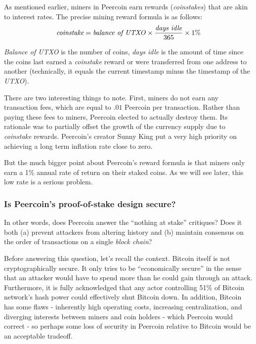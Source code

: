 \documentclass[a4paper,11pt]{article}
\begin{document}
As mentioned earlier, miners in Peercoin earn rewards (\textit{coinstakes}) that are akin to interest rates. The precise mining reward formula is as follows:
$$ \textit{coinstake} = \text{\textit{balance of \textit{UTXO}}}\times \frac{ \text{\textit{days idle}} }{365}\times 1\% $$

\textit{Balance of \textit{UTXO}} is the number of coins, \textit{days idle} is the amount of time since the coins last earned a \textit{coinstake} reward or were transferred from one address to another (technically, it equals the current timestamp minus the timestamp of the \textit{UTXO}). 

There are two interesting things to note. First, miners do not earn any transaction fees, which are equal to $.01$ Peercoin per transaction. Rather than paying these fees to miners, Peercoin elected to actually destroy them. Its rationale was to partially offset the growth of the currency supply due to \textit{coinstake} rewards. Peercoin's creator Sunny King put a very high priority on achieving a long term inflation rate close to zero.

But the much bigger point about Peercoin's reward formula is that miners only earn a 1\% annual rate of return on their staked coins. As we will see later, this low rate is a serious problem.

\subsubsection*{Is Peercoin's proof-of-stake design secure?}

In other words, does Peercoin answer the ``nothing at stake'' critiques? Does it both (a) prevent attackers from altering history and (b) maintain consensus on the order of transactions on a single \textit{block chain}?

Before answering this question, let's recall the context. Bitcoin itself is not cryptographically secure\cite{Fischer}. It only tries to be ``economically secure'' in the sense that an attacker would have to spend more than he could gain through an attack. Furthermore, it is fully acknowledged that any actor controlling 51\% of Bitcoin network's hash power could effectively shut Bitcoin down. In addition, Bitcoin has some flaws - inherently high operating costs, increasing centralization, and diverging interests between miners and coin holders - which Peercoin would correct - so perhaps some loss of security in Peercoin relative to Bitcoin would be an acceptable tradeoff. 
\end{document}
